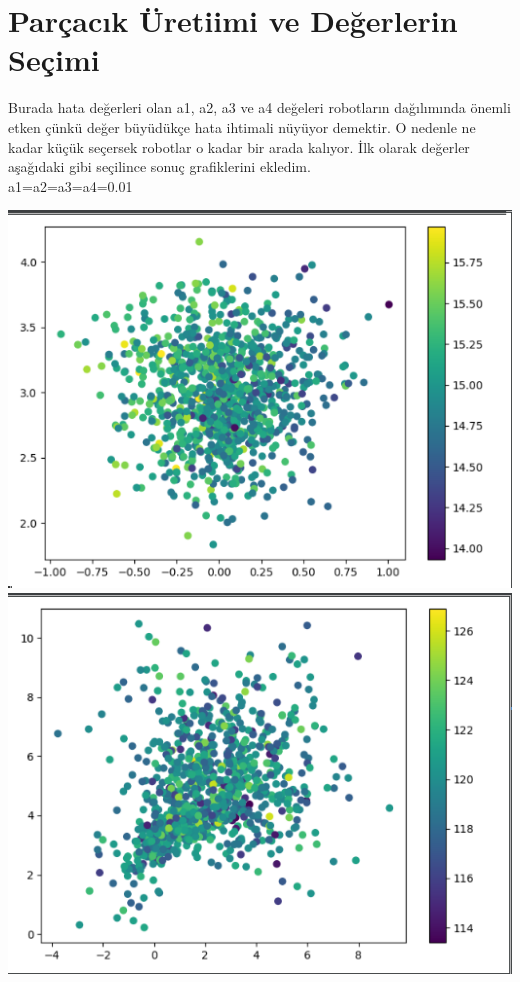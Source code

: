 \documentclass{article}
\begin{document}
	\section{Parçacık Üretiimi ve Değerlerin Seçimi}
	Burada hata değerleri olan a1, a2, a3 ve a4 değeleri robotların dağılımında önemli etken çünkü değer büyüdükçe hata ihtimali nüyüyor demektir. O nedenle ne kadar küçük seçersek robotlar o kadar bir arada kalıyor. 
	İlk olarak değerler aşağıdaki gibi seçilince sonuç grafiklerini ekledim.\\
	a1=a2=a3=a4=0.01
		\begin{center}
		\includegraphics[scale=0.4]{step1}
		\includegraphics[scale=0.4]{step2}

\end{center}
\end{document}
